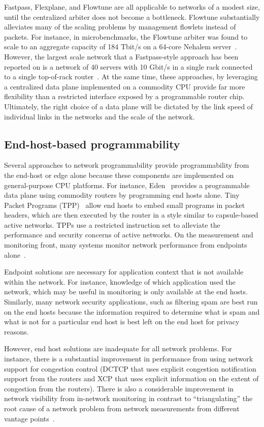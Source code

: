 Fastpass, Flexplane, and Flowtune are all applicable to networks of a modest
size, until the centralized arbiter does not become a bottleneck. Flowtune
substantially alleviates many of the scaling problems by management flowlets
instead of packets. For instance, in microbenchmarks, the Flowtune arbiter was
found to scale to an aggregate capacity of 184 Tbit/s on a 64-core Nehalem
server~\cite{flowtune}. However, the largest scale network that a
Fastpass-style approach has been reported on is a network of 40 servers with 10
Gbit/s in a single rack connected to a single top-of-rack
router~\cite{flexplane}. At the same time, these approaches, by leveraging a
centralized data plane implemented on a commodity CPU provide far more
flexibility than a restricted interface exposed by a programmable router chip.
Ultimately, the right choice of a data plane will be dictated by the link speed
of individual links in the networks and the scale of the network.

\subsection{End-host-based programmability}
Several approaches to network programmability provide programmability from the
end-host or edge alone because these components are implemented on
general-purpose CPU platforms. For instance, Eden~\cite{eden} provides a
programmable data plane using commodity routers by programming end hosts alone.
Tiny Packet Programs (TPP)~\cite{tpp} allow end hosts to embed small programs
in packet headers, which are then executed by the router in a style similar to
capsule-based active networks. TPPs use a restricted instruction set to
alleviate the performance and security concerns of active networks. On the
measurement and monitoring front, many systems monitor network performance from
endpoints alone~\cite{netpoirot, minlan-snap, dapper-sosr, trumpet,
azure-smartnic}.

Endpoint solutions are necessary for application context that is not available
within the network. For instance, knowledge of which application used the
network, which may be useful in monitoring is only available at the end hosts.
Similarly, many network security applications, such as filtering spam are best
run on the end hosts because the information required to determine what is spam
and what is not for a particular end host is best left on the end host for
privacy reasons.

However, end host solutions are inadequate for all network problems. For
instance, there is a substantial improvement in performance from using network
support for congestion control (\eg DCTCP that uses explicit congestion
notification support from the routers and XCP that uses explicit information
on the extent of congestion from the routers). There is also a considerable
improvement in network visibility from in-network monitoring in contrast to
``triangulating'' the root cause of a network problem from network measurements
from different vantage points~\cite{pingmesh}.

